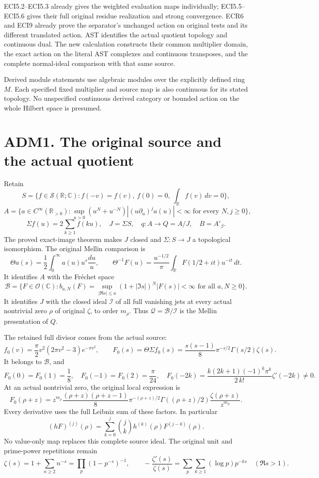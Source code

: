 ECI5.2--ECI5.3 already gives the weighted evaluation maps individually;
ECI5.5--ECI5.6 gives their full original residue realization and strong
convergence. ECR6 and ECI9 already prove the separator's unchanged
action on original tests and its different translated action. AST
identifies the actual quotient topology and continuous dual. The new
calculation constructs their common multiplier domain, the exact action
on the literal AST complexes and continuous transposes, and the complete
normal-ideal comparison with that same source.

Derived module statements use algebraic modules over the explicitly
defined ring \(M\). Each specified fixed multiplier and source map is
also continuous for its stated topology. No unspecified continuous
derived category or bounded action on the whole Hilbert space is
presumed.

\section{ADM1. The original source and the actual
quotient}\label{adm1.-the-original-source-and-the-actual-quotient}

Retain \[
S=\{f\in\mathcal S(\mathbb R;\mathbb C):
f(-v)=f(v),\ f(0)=0,\ \int_{\mathbb R}f(v)\,dv=0\},
\] \[
A=\{a\in C^\infty(\mathbb R_{>0}):
\sup_{u>0}(u^N+u^{-N})|(u\partial_u)^ja(u)|<\infty
\text{ for every }N,j\ge0\},
\] \[
\Sigma f(u)=2\sum_{k\ge1}f(ku),\quad J=\Sigma S,\quad
q:A\to Q=A/J,\quad B=A'_\beta .
\tag{ADM1.1}
\] The proved exact-image theorem makes \(J\) closed and
\(\Sigma:S\to J\) a topological isomorphism. The original Mellin
comparison is \[
\Theta a(s)=\frac12\int_0^\infty a(u)u^s\frac{du}{u},\qquad
\Theta^{-1}F(u)=\frac{u^{-1/2}}{\pi}
\int_{\mathbb R}F(1/2+it)u^{-it}\,dt.
\tag{ADM1.2}
\] It identifies \(A\) with the Fréchet space \[
\mathcal B=\{F\in\mathcal O(\mathbb C):
b_{a,N}(F)=\sup_{|\Re s|\le a}(1+|\Im s|)^N|F(s)|<\infty
\text{ for all }a,N\ge0\}.
\] It identifies \(J\) with the closed ideal \(\mathcal I\) of all full
vanishing jets at every actual nontrivial zero \(\rho\) of original
\(\zeta\), to order \(m_\rho\). Thus
\(\mathcal Q=\mathcal B/\mathcal I\) is the Mellin presentation of
\(Q\).

The retained full divisor comes from the actual source: \[
f_0(v)=\frac{\pi}{2}v^2(2\pi v^2-3)e^{-\pi v^2},\qquad
F_0(s)=\Theta\Sigma f_0(s)
=\frac{s(s-1)}8\pi^{-s/2}\Gamma(s/2)\zeta(s).
\tag{ADM1.3}
\] It belongs to \(\mathcal B\), and \[
F_0(0)=F_0(1)=\frac18,\quad F_0(-1)=F_0(2)=\frac{\pi}{24},\quad
F_0(-2k)=\frac{k(2k+1)(-1)^k\pi^k}{2\,k!}\zeta'(-2k)\ne0.
\tag{ADM1.4}
\] At an actual nontrivial zero, the original local expression is \[
F_0(\rho+z)=z^{m_\rho}
\frac{(\rho+z)(\rho+z-1)}8\pi^{-(\rho+z)/2}
\Gamma((\rho+z)/2)\frac{\zeta(\rho+z)}{z^{m_\rho}}.
\tag{ADM1.5}
\] Every derivative uses the full Leibniz sum of these factors. In
particular \[
(hF)^{(j)}(\rho)=\sum_{k=0}^j\binom jk
h^{(k)}(\rho)F^{(j-k)}(\rho).
\tag{ADM1.6}
\] No value-only map replaces this complete source ideal. The original
unit and prime-power repetitions remain \[
\zeta(s)=1+\sum_{n\ge2}n^{-s}=\prod_p(1-p^{-s})^{-1},\qquad
-\frac{\zeta'(s)}{\zeta(s)}
=\sum_p\sum_{k\ge1}(\log p)p^{-ks}\quad(\Re s>1).
\tag{ADM1.7}
\]

